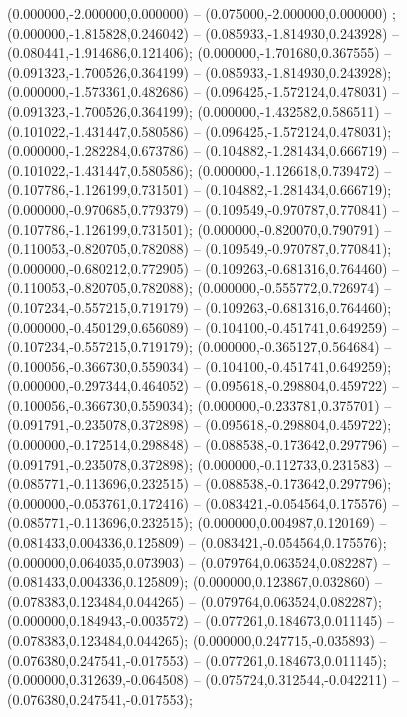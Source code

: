  (0.000000,-2.000000,0.000000) -- (0.075000,-2.000000,0.000000) ;
 (0.000000,-1.815828,0.246042) -- (0.085933,-1.814930,0.243928) -- (0.080441,-1.914686,0.121406);
 (0.000000,-1.701680,0.367555) -- (0.091323,-1.700526,0.364199) -- (0.085933,-1.814930,0.243928);
 (0.000000,-1.573361,0.482686) -- (0.096425,-1.572124,0.478031) -- (0.091323,-1.700526,0.364199);
 (0.000000,-1.432582,0.586511) -- (0.101022,-1.431447,0.580586) -- (0.096425,-1.572124,0.478031);
 (0.000000,-1.282284,0.673786) -- (0.104882,-1.281434,0.666719) -- (0.101022,-1.431447,0.580586);
 (0.000000,-1.126618,0.739472) -- (0.107786,-1.126199,0.731501) -- (0.104882,-1.281434,0.666719);
 (0.000000,-0.970685,0.779379) -- (0.109549,-0.970787,0.770841) -- (0.107786,-1.126199,0.731501);
 (0.000000,-0.820070,0.790791) -- (0.110053,-0.820705,0.782088) -- (0.109549,-0.970787,0.770841);
 (0.000000,-0.680212,0.772905) -- (0.109263,-0.681316,0.764460) -- (0.110053,-0.820705,0.782088);
 (0.000000,-0.555772,0.726974) -- (0.107234,-0.557215,0.719179) -- (0.109263,-0.681316,0.764460);
 (0.000000,-0.450129,0.656089) -- (0.104100,-0.451741,0.649259) -- (0.107234,-0.557215,0.719179);
 (0.000000,-0.365127,0.564684) -- (0.100056,-0.366730,0.559034) -- (0.104100,-0.451741,0.649259);
 (0.000000,-0.297344,0.464052) -- (0.095618,-0.298804,0.459722) -- (0.100056,-0.366730,0.559034);
 (0.000000,-0.233781,0.375701) -- (0.091791,-0.235078,0.372898) -- (0.095618,-0.298804,0.459722);
 (0.000000,-0.172514,0.298848) -- (0.088538,-0.173642,0.297796) -- (0.091791,-0.235078,0.372898);
 (0.000000,-0.112733,0.231583) -- (0.085771,-0.113696,0.232515) -- (0.088538,-0.173642,0.297796);
 (0.000000,-0.053761,0.172416) -- (0.083421,-0.054564,0.175576) -- (0.085771,-0.113696,0.232515);
 (0.000000,0.004987,0.120169) -- (0.081433,0.004336,0.125809) -- (0.083421,-0.054564,0.175576);
 (0.000000,0.064035,0.073903) -- (0.079764,0.063524,0.082287) -- (0.081433,0.004336,0.125809);
 (0.000000,0.123867,0.032860) -- (0.078383,0.123484,0.044265) -- (0.079764,0.063524,0.082287);
 (0.000000,0.184943,-0.003572) -- (0.077261,0.184673,0.011145) -- (0.078383,0.123484,0.044265);
 (0.000000,0.247715,-0.035893) -- (0.076380,0.247541,-0.017553) -- (0.077261,0.184673,0.011145);
 (0.000000,0.312639,-0.064508) -- (0.075724,0.312544,-0.042211) -- (0.076380,0.247541,-0.017553);
